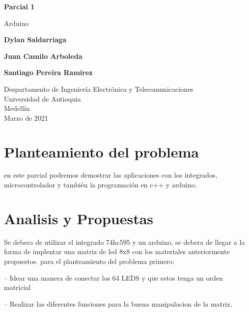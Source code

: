 \documentclass{article}
\begin{document}
\begin{titlepage}
    \begin{center}
        \vspace*{1cm}
            
        \Huge
        \textbf{Parcial 1}
            
        \vspace{0.5cm}
        \LARGE
        Arduino
            
        \vspace{1.5cm}
            
        \textbf{Dylan Saldarriaga}
        
         \textbf{Juan Camilo Arboleda}
         
         \textbf{Santiago Pereira Ramirez}
       
        \vfill
            
        \vspace{0.8cm}
            
        \Large
        Despartamento de Ingeniería Electrónica y Telecomunicaciones\\
        Universidad de Antioquia\\
        Medellín\\
        Marzo de 2021
            
    \end{center}
\end{titlepage}

\tableofcontents
\newpage
\section{Planteamiento del problema}\label{intro}
en este parcial podremos demostrar las aplicaciones con los integrados, microcontrolador y también la programación en c++ y arduino.

\section{Analisis y Propuestas} \label{contenido}

Se debera de utilizar el integrado 74hc595 y un arduino, se debera de llegar a la forma de implentar una matriz de led 8x8 con los materiales anteriormente propuestos. 
para el planteamiento del problema primero:

-- Idear una manera de conectar los 64 LEDS y que estos tenga un orden matricial

-- Realizar las diferentes funciones para la buena manipulacion de la matriz.
\end{document}
